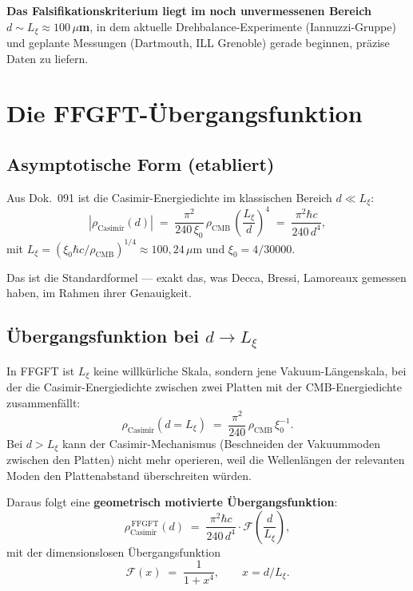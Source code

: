 \textbf{Das Falsifikationskriterium liegt im noch unvermessenen
Bereich $d \sim L_\xi \approx 100\,\mu$m}, in dem aktuelle
Drehbalance-Experimente (Iannuzzi-Gruppe) und geplante Messungen
(Dartmouth, ILL Grenoble) gerade beginnen, präzise Daten zu liefern.

\section{Die FFGFT-Übergangsfunktion}
\label{sec:vorhersage}

\subsection{Asymptotische Form (etabliert)}

Aus Dok.~091 ist die Casimir-Energiedichte im klassischen Bereich
$d \ll L_\xi$:
\begin{equation}
  |\rho_\text{Casimir}(d)|
  \;=\; \frac{\pi^2}{240\,\xi_0}\,\rho_\text{CMB}\,
        \left(\frac{L_\xi}{d}\right)^4
  \;=\; \frac{\pi^2 \hbar c}{240\,d^4},
  \label{eq:casimir-asymptotic}
\end{equation}
mit $L_\xi = (\xi_0\hbar c/\rho_\text{CMB})^{1/4} \approx 100{,}24\,\mu$m
und $\xi_0 = 4/30000$.

Das ist die Standardformel — exakt das, was Decca, Bressi, Lamoreaux
gemessen haben, im Rahmen ihrer Genauigkeit.

\subsection{\texorpdfstring{Übergangsfunktion bei $d \to L_\xi$}{Uebergangsfunktion bei d gegen L_xi}}

In FFGFT ist $L_\xi$ keine willkürliche Skala, sondern jene
Vakuum-Längenskala, bei der die Casimir-Energiedichte zwischen
zwei Platten mit der CMB-Energiedichte zusammenfällt:
\begin{equation}
  \rho_\text{Casimir}(d = L_\xi)
  \;=\; \frac{\pi^2}{240}\,\rho_\text{CMB}\,\xi_0^{-1}.
\end{equation}
Bei $d > L_\xi$ kann der Casimir-Mechanismus (Beschneiden der
Vakuummoden zwischen den Platten) nicht mehr operieren, weil die
Wellenlängen der relevanten Moden den Plattenabstand überschreiten
würden.

Daraus folgt eine \textbf{geometrisch motivierte Übergangsfunktion}:
\begin{equation}
  \rho_\text{Casimir}^{\,\text{FFGFT}}(d)
  \;=\; \frac{\pi^2 \hbar c}{240\,d^4}
        \cdot \mathcal{F}\!\left(\frac{d}{L_\xi}\right),
  \label{eq:ffgft-form}
\end{equation}
mit der dimensionslosen Übergangsfunktion
\begin{equation}
  \mathcal{F}(x) \;=\; \frac{1}{1 + x^4},
  \qquad x = d/L_\xi.
  \label{eq:transition}
\end{equation}

